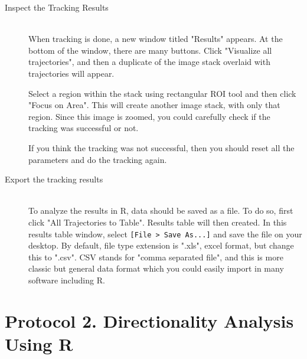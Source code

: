 \documentclass[11pnt]{article}
\begin{document}
\begin{description}
\item[Inspect the Tracking Results]\hfill\\

When tracking is done, a new window titled "Results" appears. At the bottom of the window, there are many buttons. Click "Visualize all trajectories", and then a duplicate of the image stack overlaid with trajectories will appear. 

Select a region within the stack using rectangular ROI tool and then click "Focus on Area". This will create another image stack, with only that region. Since this image is zoomed, you could carefully check if the tracking was successful or not. 

If you think the tracking was not successful, then you should reset all the parameters and do the tracking again.
\item[Export the tracking results]\hfill\\

To analyze the results in R, data should be saved as a file. To do so, first click "All Trajectories to Table". Results table will then created. In this results table window, select \verb"[File > Save As...]" and save the file on your desktop. By default, file type extension is ".xls", excel format, but change this to ".csv". CSV stands for "comma separated file", and this is more classic but general data format which you could easily import in many software including R.  
\end{description}

\section{Protocol 2. Directionality Analysis Using R}
\end{document}
